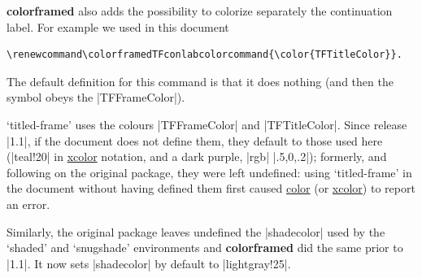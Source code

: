 \documentclass[a4paper,dvipdfmx,10pt,english]{article}
\def\colorframedTFconlabcolorcommand{\color{TFTitleColor}}
\def\ctanpackage#1{\href{https://ctan.org/pkg/#1}{#1}}
\newcommand\colorframed{%
        \texorpdfstring{{\color{joli}\bfseries colorframed}}{colorframed}\xspace}
\begin{document}
  \colorframed also adds the possibility to colorize separately the continuation
  label.  For example we used in this document\begingroup{}
\begin{verbatim}
\renewcommand\colorframedTFconlabcolorcommand{\color{TFTitleColor}}.
\end{verbatim}
\endgroup
The default definition for this command is that it does nothing (and then the
  symbol obeys the |TFFrameColor|).
 
  `titled-frame' uses the colours |TFFrameColor| and |TFTitleColor|.  Since
  release |1.1|, if the document does not define them, they default to
  those used here (|teal!20| in \ctanpackage{xcolor} notation, and a dark
  purple, |rgb| |.5,0,.2|); formerly, and following on the original package,
  they were left undefined: using `titled-frame' in the document
  without having defined them first caused \ctanpackage{color} (or \ctanpackage{xcolor})
  to report an error.

  Similarly, the original package leaves undefined the |shadecolor| used by
  the `shaded' and `snugshade' environments and \colorframed did the same
  prior to |1.1|. It now sets |shadecolor| by default to |lightgray!25|.
\end{document}
